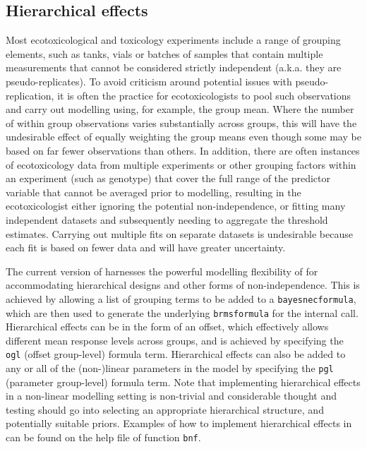 \documentclass[
  shortnames]{jss}
\begin{document}
\hypertarget{hierarchical-effects}{%
\subsection{Hierarchical effects}\label{hierarchical-effects}}

Most ecotoxicological and toxicology experiments include a range of grouping elements, such as tanks, vials or batches of samples that contain multiple measurements that cannot be considered strictly independent (a.k.a. they are pseudo-replicates). To avoid criticism around potential issues with pseudo-replication, it is often the practice for ecotoxicologists to pool such observations and carry out modelling using, for example, the group mean. Where the number of within group observations varies substantially across groups, this will have the undesirable effect of equally weighting the group means even though some may be based on far fewer observations than others. In addition, there are often instances of ecotoxicology data from multiple experiments or other grouping factors within an experiment (such as genotype) that cover the full range of the predictor variable that cannot be averaged prior to modelling, resulting in the ecotoxicologist either ignoring the potential non-independence, or fitting many independent datasets and subsequently needing to aggregate the threshold estimates. Carrying out multiple fits on separate datasets is undesirable because each fit is based on fewer data and will have greater uncertainty.

The current version of  harnesses the powerful modelling flexibility of  for accommodating hierarchical designs and other forms of non-independence. This is achieved by allowing a list of grouping terms to be added to a \texttt{bayesnecformula}, which are then used to generate the underlying \texttt{brmsformula} for the  internal call. Hierarchical effects can be in the form of an offset, which effectively allows different mean response levels across groups, and is achieved by specifying the \texttt{ogl} (offset group-level) formula term. Hierarchical effects can also be added to any or all of the (non-)linear parameters in the model by specifying the \texttt{pgl} (parameter group-level) formula term. Note that implementing hierarchical effects in a non-linear modelling setting is non-trivial and considerable thought and testing should go into selecting an appropriate hierarchical structure, and potentially suitable priors. Examples of how to implement hierarchical effects in  can be found on the help file of function \texttt{bnf}.
\end{document}
